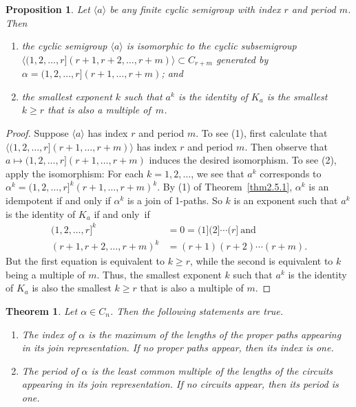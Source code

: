 \documentclass{surv-l}
\numberwithin{equation}{section}
\numberwithin{table}{section}
\numberwithin{figure}{section}
\theoremstyle{plain}
\newtheorem{theorem}[equation]{Theorem}
\newtheorem{proposition}[equation]{Proposition}
\theoremstyle{definition}
\begin{document}
\setcounter{equation}{1}
\begin{proposition}\label{prop2.6.2}
Let $\langle a \rangle$ be any finite cyclic semigroup with index
$r$ and period $m$. Then
\begin{enumerate}
 \item[(1)] the cyclic semigroup $\langle a\rangle$ is
isomorphic to the cyclic subsemigroup $\langle
(1,2,\ldots,r](r+1,r+2,\ldots, r+m)\rangle\subset C_{r+m}$
generated by $\alpha= (1,2,\ldots, r](r+1,\ldots, r+m)$; and

 \item[(2)] the smallest exponent $k$ such that $a^{k}$
is the identity of $K_{a}$ is the smallest $k\geq r$ that is
also a multiple of~$m$.
\end{enumerate}
\end{proposition}

\begin{proof} Suppose $\langle a\rangle$ has index $r$ and period $m$. To see
(1), first calculate that $\langle(1,2,\ldots,  r](r+1,\ldots,
r+m)\rangle$ has index $r$ and period $m$. Then observe that
$a\mapsto(1,2,\ldots, r](r+1,\ldots, r+m)$ induces the desired
isomorphism. To see (2), apply the isomorphism: For each
$k=1,2,\ldots$, we see that $a^{k}$ corresponds to
$\alpha^{k}=(1,2,\ldots, r]^{k}(r+1,\ldots,r+m)^{k}$. By (1) of
Theorem~\ref{thm2.5.1}, $\alpha^{k}$ is an idempotent if and only
if $\alpha^{k}$ is a join of 1-paths. So $k$ is an exponent such
that $a^{k}$ is the identity of $K_{a}$ if and only~if
\begin{align*}
(1, 2,\ldots,r]^{k}&=0=(1](2]\cdots(r]\ \mathrm{and}\\
(r+1,r+2,\ldots, r+m)^{k}&=(r+1)(r+2)\cdots(r+m).
\end{align*}
But the first equation is equivalent to $k\geq r$, while the
second is equivalent to $k$ being a multiple of $m$. Thus, the
smallest exponent $k$ such that $a^{k}$ is the identity of $K_{a}$
is also the smallest $k\geq r$ that is also a multiple of $m$.
\end{proof}

\begin{theorem}\label{thm2.6.3}
Let $\alpha\in C_{n}$. Then the following statements are true.
\begin{enumerate}
\item[(1)] The index of $\alpha$ is the maximum of the
lengths of the proper paths appearing in its join
representation. If no proper paths appear, then its index is one.

\item[(2)] The period of $\alpha$ is the least common
multiple of the lengths of the circuits appearing in its join
representation. If no circuits appear, then its period is one.
\end{enumerate}
\end{theorem}
\end{document}
